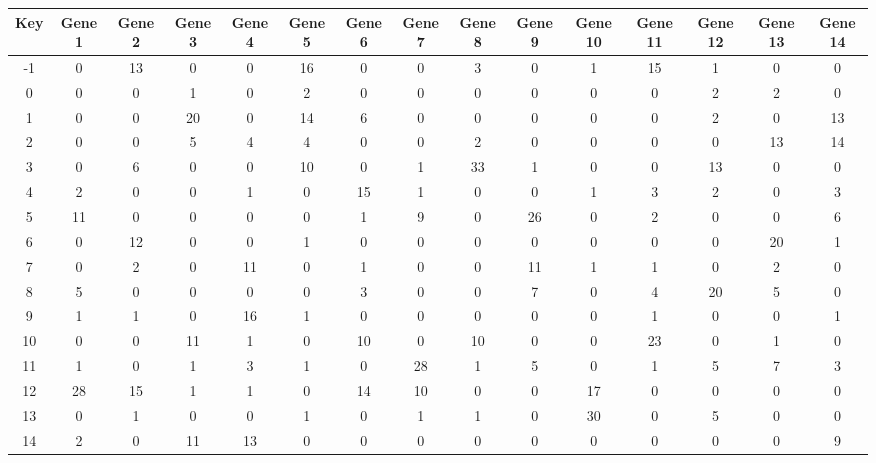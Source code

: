 \begin{tabular}{|c|c|c|c|c|c|c|c|c|c|c|c|c|c|c|}
\hline
Key & Gene 1 & Gene 2 & Gene 3 & Gene 4 & Gene 5 & Gene 6 & Gene 7 & Gene 8 & Gene 9 & Gene 10 & Gene 11 & Gene 12 & Gene 13 & Gene 14 \\
\hline
-1 & 0 & 13 & 0 & 0 & 16 & 0 & 0 & 3 & 0 & 1 & 15 & 1 & 0 & 0 \\
0 & 0 & 0 & 1 & 0 & 2 & 0 & 0 & 0 & 0 & 0 & 0 & 2 & 2 & 0 \\
1 & 0 & 0 & 20 & 0 & 14 & 6 & 0 & 0 & 0 & 0 & 0 & 2 & 0 & 13 \\
2 & 0 & 0 & 5 & 4 & 4 & 0 & 0 & 2 & 0 & 0 & 0 & 0 & 13 & 14 \\
3 & 0 & 6 & 0 & 0 & 10 & 0 & 1 & 33 & 1 & 0 & 0 & 13 & 0 & 0 \\
4 & 2 & 0 & 0 & 1 & 0 & 15 & 1 & 0 & 0 & 1 & 3 & 2 & 0 & 3 \\
5 & 11 & 0 & 0 & 0 & 0 & 1 & 9 & 0 & 26 & 0 & 2 & 0 & 0 & 6 \\
6 & 0 & 12 & 0 & 0 & 1 & 0 & 0 & 0 & 0 & 0 & 0 & 0 & 20 & 1 \\
7 & 0 & 2 & 0 & 11 & 0 & 1 & 0 & 0 & 11 & 1 & 1 & 0 & 2 & 0 \\
8 & 5 & 0 & 0 & 0 & 0 & 3 & 0 & 0 & 7 & 0 & 4 & 20 & 5 & 0 \\
9 & 1 & 1 & 0 & 16 & 1 & 0 & 0 & 0 & 0 & 0 & 1 & 0 & 0 & 1 \\
10 & 0 & 0 & 11 & 1 & 0 & 10 & 0 & 10 & 0 & 0 & 23 & 0 & 1 & 0 \\
11 & 1 & 0 & 1 & 3 & 1 & 0 & 28 & 1 & 5 & 0 & 1 & 5 & 7 & 3 \\
12 & 28 & 15 & 1 & 1 & 0 & 14 & 10 & 0 & 0 & 17 & 0 & 0 & 0 & 0 \\
13 & 0 & 1 & 0 & 0 & 1 & 0 & 1 & 1 & 0 & 30 & 0 & 5 & 0 & 0 \\
14 & 2 & 0 & 11 & 13 & 0 & 0 & 0 & 0 & 0 & 0 & 0 & 0 & 0 & 9 \\
\hline
\end{tabular}